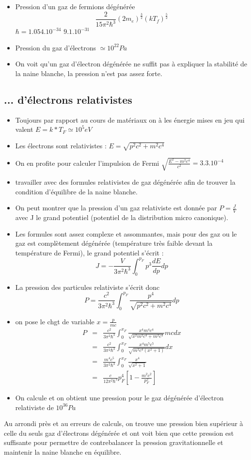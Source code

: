 \documentclass[a4paper]{rapport}
\begin{document}
\begin{itemize}
  \item Pression d'un gaz de fermions dégénérée $$\frac{2}{15\pi^2\hbar^3}(2m_e)^{\frac{3}{2}}(kT_f)^{\frac{5}{2}}$$
  $\hbar = 1.054.10^{-34}$
  $9.1.10^{-31}$
  \item Pression du gaz d'électrons $\simeq \boxed{10^{22} Pa}$
  \item On voit qu'un gaz d'électron dégénérée ne suffit pas à expliquer la stabilité de la naine blanche, la pression n'est pas assez forte.
\end{itemize}

\subsection{... d'électrons relativistes}
\begin{itemize}
  \item Toujours par rapport au cours de matériaux on à les énergie mises en jeu qui valent $E = k*T_F \simeq \boxed{10^5 eV}$
  \item Les électrons sont relativistes : $E = \sqrt{p^2c^2 + m^2c^4}$
  \item On en profite pour calculer l'impulsion de Fermi $ \sqrt{\frac{E^2 - m^2c^4}{c^2}} = 3.3.10^{-4}$
  \item travailler avec des formules relativistes de gaz dégénérée afin de trouver la condition d'équilibre de la naine blanche.
\end{itemize}
\nl
\begin{itemize}
  \item On peut montrer que la pression d'un gaz relativiste est donnée par $P = \frac{J}{V}$ avec J le grand potentiel (potentiel de la distribution micro canonique).
  \item Les formules sont assez complexe et assommantes, mais pour des gaz ou le gaz est complètement dégénérée (température très faible devant la température de Fermi), le grand potentiel s'écrit :
  $$J = - \frac{V}{3\pi^2\hbar^3}\int_0^{p_F} p^3 \frac{dE}{dp} dp$$
  \item La pression des particules relativiste s'écrit donc $$P = \frac{c^2}{3\pi^2\hbar^3}\int_0^{p_F} \frac{p^4}{\sqrt{p^2c^2 + m^2c^4}} dp $$
  \item on pose le chgt de variable $x = \frac{p}{mc}$
  \begin{eqnarray*}
    P &=& \frac{c^2}{3\pi^2\hbar^3}\int_0^{x_F} \frac{x^4 m^4 c^4}{\sqrt{x^2 m^2 c^4 + m^2c^4}}mcdx\\
    &=&\frac{c^2}{3\pi^2\hbar^3}\int_0^{x_F}\frac{x^4m^5c^5}{\sqrt{m^2c^4(x^2 + 1)}}dx\\
    &=&\frac{m^4c^5}{3\pi^2\hbar^3}\int_0^{x_F} \frac{x^4}{\sqrt{x^2 + 1}}\\
    &=& \boxed{\frac{c}{12\pi^2 \hbar^3}p_F^4\left[1 - \frac{m^2 c^2}{p_F^2}\right]}
  \end{eqnarray*}
  \item On calcule et on obtient une pression pour le gaz dégénérée d'électron relativiste de $\boxed{10^{36}Pa}$

\end{itemize}
Au arrondi près et au erreurs de calculs, on trouve une pression bien supérieur à celle du seuls gaz d’électrons dégénérée et ont voit bien que cette pression est suffisante pour permettre de contrebalancer la pression gravitationnelle et maintenir la naine blanche en équilibre.
\end{document}
